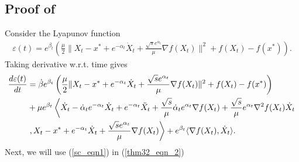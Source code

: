 \documentclass{article}
\theoremstyle{plain}
\theoremstyle{definition}
\theoremstyle{remark}
\begin{document}
\subsection{Proof of }\label{thm4_proof}
Consider the Lyapunov function
    \begin{align}\label{thm32_eqn_1}
        \varepsilon(t) = e^{\beta_t}\left(\frac{\mu}{2}\|X_t-x^*+e^{-\alpha_t}\dot X_t+\frac{\sqrt{s}e^{\alpha_t}}{\mu}\nabla f(X_t)\|^2+f(X_t)-f(x^*)\right).
    \end{align}
    Taking derivative w.r.t. time gives
    \begin{align}\label{thm32_eqn_2}
       \frac{d\varepsilon(t)}{dt}&=\dot \beta e^{\beta_t}\left(\frac{\mu}{2}\|X_t-x^*+e^{-\alpha_t}\dot X_t+\frac{\sqrt{s}e^{\alpha_t}}{\mu}\nabla f(X_t)\|^2+f(X_t)-f(x^*)\right)\nonumber\\
       & + \mu e^{\beta_t}\left\langle \dot X_t-\dot \alpha_t e^{-\alpha_t}\dot X_t + e^{-\alpha_t}\Ddot{X}_t +\frac{\sqrt{s}}{\mu}\dot \alpha_te^{\alpha_t}\nabla f(X_t)+\frac{\sqrt{s}}{\mu}e^{\alpha_t}\nabla ^2f(X_t)\dot X_t\right.\nonumber\\
       &\left. ,X_t-x^*+e^{-\alpha_t}\dot X_t+\frac{\sqrt{s}e^{\alpha_t}}{\mu}\nabla f(X_t)\right\rangle+e^{\beta_t}\langle \nabla f(X_t),\dot X_t \rangle.
    \end{align}
    Next, we will use (\ref{sc_eqn1}) in (\ref{thm32_eqn_2})
\end{document}

